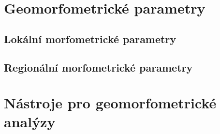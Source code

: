 




\section{Geomorfometrické parametry}





\subsection{Lokální morfometrické parametry}




\subsection{Regionální morfometrické parametry}




\section{Nástroje pro geomorfometrické analýzy}